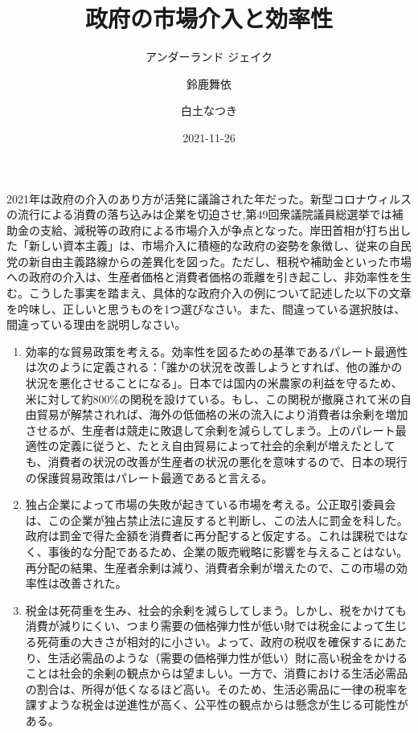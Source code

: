 \documentclass[
]{ltjarticle}
\title{政府の市場介入と効率性}
\author{アンダーランド ジェイク \and 鈴鹿舞依 \and 白土なつき}
\date{2021-11-26}
\begin{document}
\maketitle

2021年は政府の介入のあり方が活発に議論された年だった。新型コロナウィルスの流行による消費の落ち込みは企業を切迫させ,第49回衆議院議員総選挙では補助金の支給、減税等の政府による市場介入が争点となった。岸田首相が打ち出した「新しい資本主義」は、市場介入に積極的な政府の姿勢を象徴し、従来の自民党の新自由主義路線からの差異化を図った。ただし、租税や補助金といった市場への政府の介入は、生産者価格と消費者価格の乖離を引き起こし、非効率性を生む。こうした事実を踏まえ、具体的な政府介入の例について記述した以下の文章を吟味し、正しいと思うものを1つ選びなさい。また、間違っている選択肢は、間違っている理由を説明しなさい。

\begin{enumerate}
\item 効率的な貿易政策を考える。効率性を図るための基準であるパレート最適性は次のように定義される：「誰かの状況を改善しようとすれば、他の誰かの状況を悪化させることになる」。日本では国内の米農家の利益を守るため、米に対して約800$\%$の関税を設けている。もし、この関税が撤廃されて米の自由貿易が解禁されれば、海外の低価格の米の流入により消費者は余剰を増加させるが、生産者は競走に敗退して余剰を減らしてしまう。上のパレート最適性の定義に従うと、たとえ自由貿易によって社会的余剰が増えたとしても、消費者の状況の改善が生産者の状況の悪化を意味するので、日本の現行の保護貿易政策はパレート最適であると言える。

\item 独占企業によって市場の失敗が起きている市場を考える。公正取引委員会は、この企業が独占禁止法に違反すると判断し、この法人に罰金を科した。政府は罰金で得た金額を消費者に再分配すると仮定する。これは課税ではなく、事後的な分配であるため、企業の販売戦略に影響を与えることはない。再分配の結果、生産者余剰は減り、消費者余剰が増えたので、この市場の効率性は改善された。

\item 税金は死荷重を生み、社会的余剰を減らしてしまう。しかし、税をかけても消費が減りにくい、つまり需要の価格弾力性が低い財では税金によって生じる死荷重の大きさが相対的に小さい。よって、政府の税収を確保するにあたり、生活必需品のような（需要の価格弾力性が低い）財に高い税金をかけることは社会的余剰の観点からは望ましい。一方で、消費における生活必需品の割合は、所得が低くなるほど高い。そのため、生活必需品に一律の税率を課すような税金は逆進性が高く、公平性の観点からは懸念が生じる可能性がある。



\end{enumerate}
\end{document}
